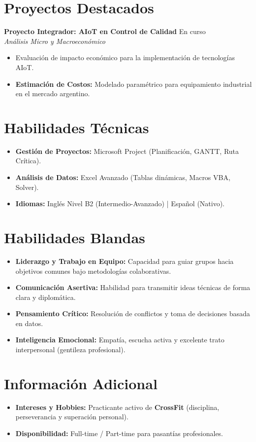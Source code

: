 \documentclass[11pt,a4paper]{article}
\begin{document}
\section{Proyectos Destacados}
\textbf{Proyecto Integrador: AIoT en Control de Calidad} \hfill En curso \\
\textit{Análisis Micro y Macroeconómico}
\begin{itemize}[noitemsep, topsep=0pt]
    \item Evaluación de impacto económico para la implementación de tecnologías AIoT.
    \item \textbf{Estimación de Costos:} Modelado paramétrico para equipamiento industrial en el mercado argentino.
\end{itemize}

\section{Habilidades Técnicas}
\begin{itemize}[label={}, leftmargin=0pt]
    \item \textbf{Gestión de Proyectos:} Microsoft Project (Planificación, GANTT, Ruta Crítica).
    \item \textbf{Análisis de Datos:} Excel Avanzado (Tablas dinámicas, Macros VBA, Solver).
    \item \textbf{Idiomas:} Inglés Nivel B2 (Intermedio-Avanzado) | Español (Nativo).
\end{itemize}

\section{Habilidades Blandas}
\begin{itemize}[noitemsep, topsep=0pt]
    \item \textbf{Liderazgo y Trabajo en Equipo:} Capacidad para guiar grupos hacia objetivos comunes bajo metodologías colaborativas.
    \item \textbf{Comunicación Asertiva:} Habilidad para transmitir ideas técnicas de forma clara y diplomática.
    \item \textbf{Pensamiento Crítico:} Resolución de conflictos y toma de decisiones basada en datos.
    \item \textbf{Inteligencia Emocional:} Empatía, escucha activa y excelente trato interpersonal (gentileza profesional).
\end{itemize}

\section{Información Adicional}
\begin{itemize}[label={}, leftmargin=0pt]
    \item \textbf{Intereses y Hobbies:} Practicante activo de \textbf{CrossFit} (disciplina, perseverancia y superación personal).
    \item \textbf{Disponibilidad:} Full-time / Part-time para pasantías profesionales.
\end{itemize}
\end{document}
